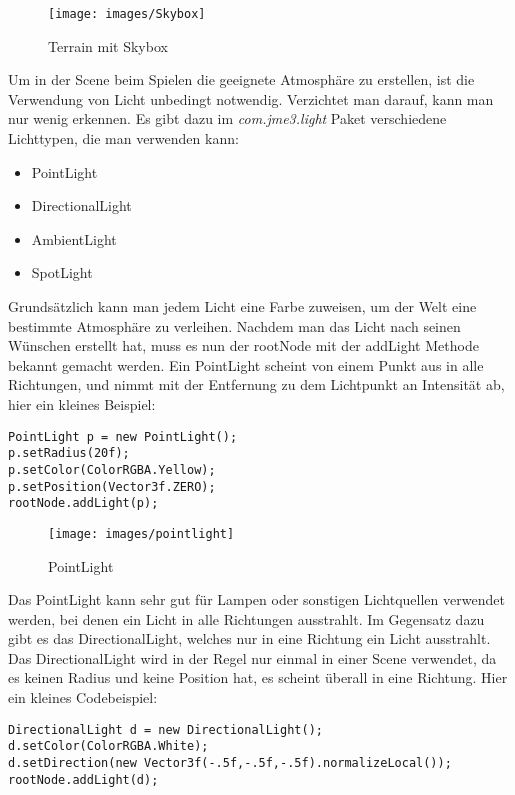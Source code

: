 \begin{figure}[h!]
		\caption{Terrain mit Skybox}
		
		\centering\texttt{[image: images/Skybox]} 
		
\end{figure} 
\newpage



Um in der Scene beim Spielen die geeignete Atmosphäre zu erstellen, ist die Verwendung von Licht unbedingt notwendig. Verzichtet man darauf, kann man nur wenig erkennen. Es gibt dazu im \emph{com.jme3.light} Paket verschiedene Lichttypen, die man verwenden kann:
\begin{itemize}
	\item PointLight
	\item DirectionalLight
	\item AmbientLight
	\item SpotLight
\end{itemize}
Grundsätzlich kann man jedem Licht eine Farbe zuweisen, um der Welt eine bestimmte Atmosphäre zu verleihen. Nachdem man das Licht nach seinen Wünschen erstellt hat, muss es nun der rootNode mit der addLight Methode bekannt gemacht werden. Ein PointLight scheint von einem Punkt aus in alle Richtungen, und nimmt mit der Entfernung zu dem Lichtpunkt an Intensität ab, hier ein kleines Beispiel:
\begin{lstlisting}
PointLight p = new PointLight();
p.setRadius(20f);
p.setColor(ColorRGBA.Yellow);
p.setPosition(Vector3f.ZERO);
rootNode.addLight(p);
\end{lstlisting}

\begin{figure}[h!]
	
	
	\caption{PointLight}
	
	\centering\texttt{[image: images/pointlight]} 
	
\end{figure}
Das PointLight kann sehr gut für Lampen oder sonstigen Lichtquellen verwendet werden, bei denen ein Licht in alle Richtungen ausstrahlt. Im Gegensatz dazu gibt es das DirectionalLight, welches nur in eine Richtung ein Licht ausstrahlt. Das DirectionalLight wird in der Regel nur einmal in einer Scene verwendet, da es keinen Radius und keine Position hat, es scheint überall in eine Richtung. Hier ein kleines Codebeispiel:
\begin{lstlisting}
DirectionalLight d = new DirectionalLight();
d.setColor(ColorRGBA.White);
d.setDirection(new Vector3f(-.5f,-.5f,-.5f).normalizeLocal());
rootNode.addLight(d);
\end{lstlisting}

